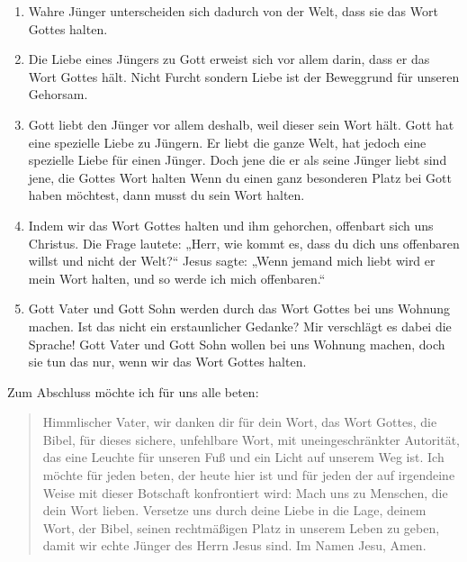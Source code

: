 \begin{enumerate}
  \item Wahre Jünger unterscheiden sich dadurch von der Welt, dass sie das Wort Gottes halten.
  \item Die Liebe eines Jüngers zu Gott erweist sich vor allem darin, dass er das Wort Gottes hält.
  Nicht Furcht sondern Liebe ist der Beweggrund für unseren Gehorsam.
  \item Gott liebt den Jünger vor allem deshalb, weil dieser sein Wort hält.
  Gott hat eine spezielle Liebe zu Jüngern. 
  Er liebt die ganze Welt, hat jedoch eine spezielle Liebe für einen Jünger.
  Doch jene die er als seine Jünger liebt sind jene, die Gottes Wort halten
  Wenn du einen ganz besonderen Platz bei Gott haben möchtest, dann musst du sein Wort halten.
  \item Indem wir das Wort Gottes halten und ihm gehorchen, offenbart sich uns Christus. 
  Die Frage lautete: „Herr, wie kommt es, dass du dich uns offenbaren willst und nicht der Welt?“ 
  Jesus sagte: „Wenn jemand mich liebt wird er mein Wort halten, und so werde ich mich offenbaren.“
  \item Gott Vater und Gott Sohn werden durch das Wort Gottes bei uns Wohnung machen.
  Ist das nicht ein erstaunlicher Gedanke? 
  Mir verschlägt es dabei die Sprache! 
  Gott Vater und Gott Sohn wollen bei uns Wohnung machen, doch sie tun das nur, wenn wir das Wort Gottes halten.
\end{enumerate}

Zum Abschluss möchte ich für uns alle beten:

\begin{quotation}
  Himmlischer Vater, wir danken dir für dein Wort, das Wort Gottes, die Bibel, für dieses sichere, unfehlbare Wort, mit uneingeschränkter Autorität, das eine Leuchte für unseren Fuß und ein Licht auf unserem Weg ist.
  Ich möchte für jeden beten, der heute hier ist und für jeden der auf irgendeine Weise mit dieser Botschaft konfrontiert wird: Mach uns zu Menschen, die dein Wort lieben.
  Versetze uns durch deine Liebe in die Lage, deinem Wort, der Bibel, seinen rechtmäßigen Platz in unserem Leben zu geben, damit wir echte Jünger des Herrn Jesus sind.
  Im Namen Jesu, Amen.
\end{quotation}
